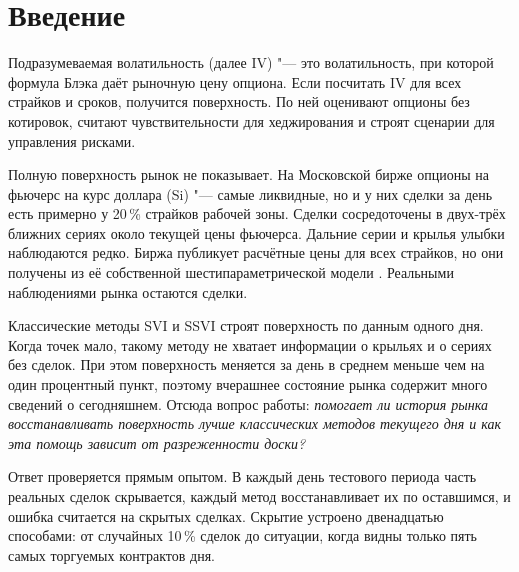 \documentclass{article}
\begin{document}
\section{Введение}\label{sec:intro}

Подразумеваемая волатильность (далее IV) "--- это волатильность, при которой формула Блэка даёт рыночную цену опциона. Если посчитать IV для всех страйков и сроков, получится поверхность. По ней оценивают опционы без котировок, считают чувствительности для хеджирования и строят сценарии для управления рисками.

Полную поверхность рынок не показывает. На Московской бирже опционы на фьючерс на курс доллара (Si) "--- самые ликвидные, но и у них сделки за день есть примерно у 20\,\% страйков рабочей зоны. Сделки сосредоточены в двух-трёх ближних сериях около текущей цены фьючерса. Дальние серии и крылья улыбки наблюдаются редко. Биржа публикует расчётные цены для всех страйков, но они получены из её собственной шестипараметрической модели \citep{moex2024curves}. Реальными наблюдениями рынка остаются сделки.

Классические методы SVI и SSVI \citep{gatheral2014arbitrage} строят поверхность по данным одного дня. Когда точек мало, такому методу не хватает информации о крыльях и о сериях без сделок. При этом поверхность меняется за день в среднем меньше чем на один процентный пункт, поэтому вчерашнее состояние рынка содержит много сведений о сегодняшнем. Отсюда вопрос работы: \emph{помогает ли история рынка восстанавливать поверхность лучше классических методов текущего дня и как эта помощь зависит от разреженности доски?}

Ответ проверяется прямым опытом. В каждый день тестового периода часть реальных сделок скрывается, каждый метод восстанавливает их по оставшимся, и ошибка считается на скрытых сделках. Скрытие устроено двенадцатью способами: от случайных 10\,\% сделок до ситуации, когда видны только пять самых торгуемых контрактов дня.
\end{document}
